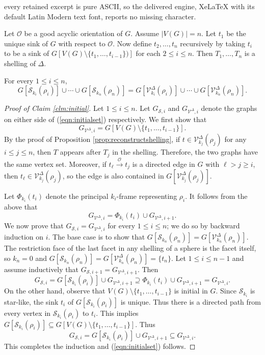 \documentclass[10pt,a4paper]{amsart}
\newcommand{\cO}{\mathcal{O}}
\newcommand{\cS}{\mathcal{S}}
\newcommand{\cV}{\mathcal{V}}
\begin{document}
every retained excerpt is pure ASCII, so the delivered engine, XeLaTeX with its default Latin Modern text font, reports no missing character.
\begin{proposition}\label{prop:reconstructshelling}
    Let $\cO$ be a good acyclic orientation of $G$. Assume $|V(G)| = n$. Let $t_1$ be the unique sink of $G$ with respect to $\cO$. Now define $t_2,\dots, t_n$ recursively by taking $t_i$ to be a sink of $G[V(G) \setminus \{t_1, \dots, t_{i-1}\})]$ for each $2 \le i \le n$. Then $T_1, \dots, T_n$ is a shelling of $\Delta$.
\end{proposition}

\begin{claim}\label{clm:initial}
For every $1 \le i \le n$, 
\begin{equation}\label{eqn:initialset}
   G[\cS_{k_i}(\rho_i)] \cup \cdots \cup G[\cS_{k_n}(\rho_n)] = G[\cV^\Delta_{k_i}(\rho_i)] \cup \cdots \cup G[\cV^\Delta_{k_n}(\rho_n)].
\end{equation}
\end{claim}

\begin{proof}[Proof of Claim \ref{clm:initial}]
Let $1 \le i \le n$. Let $G_{\cS, i}$ and $G_{\cV^\Delta, i}$ denote the graphs on either side of (\ref{eqn:initialset}) respectively. We first show that 
\[
G_{\cV^\Delta, i} = G[V(G) \setminus \{t_1, \dots, t_{i-1}\}].
\]
By the proof of Proposition \ref{prop:reconstructshelling}, if $t \in \cV^\Delta_{k_j}(\rho_j)$ for any $i \le j \le n$, then $T$ appears after $T_j$ in the shelling. Therefore, the two graphs have the same vertex set. Moreover, if $t_\ell \xrightarrow{\cO} t_j$ is a directed edge in $G$ with $\ell > j \ge i$, then $t_\ell \in \cV^\Delta_{k_j}(\rho_j)$, so the edge is also contained in $G[\cV^\Delta_{k_j}(\rho_j)]$. 

Let $\Phi_{k_i}(t_i)$ denote the principal $k_i$-frame representing $\rho_i$. It follows from the above that 
\[
G_{\cV^\Delta, i} = \Phi_{k_i}(t_i) \cup G_{\cV^\Delta, i+1}. 
\]
We now prove that $G_{\cS, i} = G_{\cV^\Delta, i}$ for every $1 \le i \le n$; we do so by backward induction on $i$. The base case is to show that $G[\cS_{k_n}(\rho_n)] = G[\cV^\Delta_{k_n}(\rho_n)]$. The restriction face of the last facet in any shelling of a sphere is the facet itself, so $k_n = 0$ and $G[\cS_{k_n}(\rho_n)] = G[\cV^\Delta_{k_n}(\rho_n)] = \{t_n\}$. Let $1 \le i \le n-1$ and assume inductively that $G_{\cS, i+1} = G_{\cV^\Delta, i+1}$. Then 
\[
G_{\cS, i} = G[\cS_{k_i}(\rho_i)] \cup G_{\cV^\Delta, i+1} \supseteq \Phi_{k_i}(t_i) \cup G_{\cV^\Delta, i+1} = G_{\cV^\Delta, i}. 
\]
On the other hand, observe that $V(G) \setminus \{t_1, \dots, t_{i-1}\}$ is initial in $G$. Since $\cS_{k_i}$ is star-like, the sink $t_i$ of $G[\cS_{k_i}(\rho_i)]$ is unique. Thus there is a directed path from every vertex in $\cS_{k_i}(\rho_i)$ to $t_i$. This implies $G[\cS_{k_i}(\rho_i)] \subseteq G[V(G) \setminus \{t_1, \dots, t_{i-1}\}]$. Thus
\[
G_{\cS, i} = G[\cS_{k_i}(\rho_i)] \cup G_{\cV^\Delta, i+1} \subseteq G_{\cV^\Delta, i}. 
\]
This completes the induction and (\ref{eqn:initialset}) follows. 
\end{proof}
\end{document}
